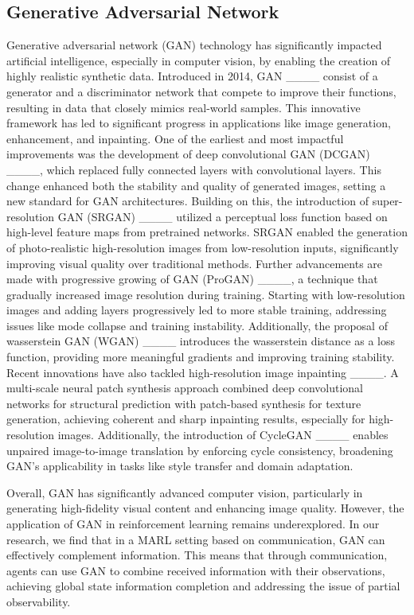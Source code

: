 \subsection{Generative Adversarial Network}

Generative adversarial network (GAN) technology has significantly impacted artificial intelligence, especially in computer vision, by enabling the creation of highly realistic synthetic data. Introduced in 2014, GAN ____ consist of a generator and a discriminator network that compete to improve their functions, resulting in data that closely mimics real-world samples. This innovative framework has led to significant progress in applications like image generation, enhancement, and inpainting. One of the earliest and most impactful improvements was the development of deep convolutional GAN (DCGAN) ____, which replaced fully connected layers with convolutional layers. This change enhanced both the stability and quality of generated images, setting a new standard for GAN architectures. Building on this, the introduction of super-resolution GAN (SRGAN) ____ utilized a perceptual loss function based on high-level feature maps from pretrained networks. SRGAN enabled the generation of photo-realistic high-resolution images from low-resolution inputs, significantly improving visual quality over traditional methods. Further advancements are made with progressive growing of GAN (ProGAN) ____, a technique that gradually increased image resolution during training. Starting with low-resolution images and adding layers progressively led to more stable training, addressing issues like mode collapse and training instability. Additionally, the proposal of wasserstein GAN (WGAN) ____ introduces the wasserstein distance as a loss function, providing more meaningful gradients and improving training stability. Recent innovations have also tackled high-resolution image inpainting ____. A multi-scale neural patch synthesis approach combined deep convolutional networks for structural prediction with patch-based synthesis for texture generation, achieving coherent and sharp inpainting results, especially for high-resolution images. Additionally, the introduction of CycleGAN ____ enables unpaired image-to-image translation by enforcing cycle consistency, broadening GAN's applicability in tasks like style transfer and domain adaptation. 

Overall, GAN has significantly advanced computer vision, particularly in generating high-fidelity visual content and enhancing image quality. However, the application of GAN in reinforcement learning remains underexplored. In our research, we find that in a MARL setting based on communication, GAN can effectively complement information. This means that through communication, agents can use GAN to combine received information with their observations, achieving global state information completion and addressing the issue of partial observability.
